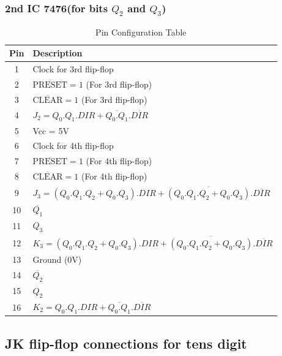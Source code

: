 \documentclass[a4paper,12pt]{article}
\begin{document}
\subsubsection{2nd IC 7476(for bits $Q_2$ and $Q_3$)}
\begin{table}[H]
    \centering
    \renewcommand{\arraystretch}{1.3} %
    \begin{tabular}{|c|l|}
        \hline
        \textbf{Pin} & \textbf{Description} \\ 
        \hline
        1  & Clock for 3rd flip-flop \\ 
        2  & $\overline{\text{PRESET}} = 1$ (For 3rd flip-flop) \\ 
        3  & $\overline{\text{CLEAR}} = 1$ (For 3rd flip-flop) \\ 
        4  & $J_2 = Q_0.Q_1.DIR+\overline{Q_0.Q_1}.\overline{DIR}$ \\ 
        5  & Vcc = 5V \\ 
        6  & Clock for 4th flip-flop \\ 
        7  & $\overline{\text{PRESET}} = 1$ (For 4th flip-flop) \\ 
        8  & $\overline{\text{CLEAR}} = 1$ (For 4th flip-flop) \\ 
        9  & $J_3 = (Q_0.Q_1.Q_2+Q_0.Q_3).DIR+\overline{(Q_0.Q_1.Q_2+Q_0.Q_3)}.\overline{DIR}$ \\ 
        10 & $\overline{Q_1}$ \\ 
        11 & $Q_3$ \\ 
        12 & $K_3 = (Q_0.Q_1.Q_2+Q_0.Q_3).DIR+\overline{(Q_0.Q_1.Q_2+Q_0.Q_3)}.\overline{DIR}$ \\ 
        13 & Ground (0V) \\ 
        14 & $\overline{Q_2}$ \\ 
        15 & $Q_2$ \\ 
        16 & $K_2 = Q_0.Q_1.DIR+\overline{Q_0.Q_1}.\overline{DIR}$ \\ 
        \hline
    \end{tabular}
    \caption{Pin Configuration Table}
    \label{tab:pin_config}
\end{table}

\subsection{JK flip-flop connections for tens digit}
\end{document}
